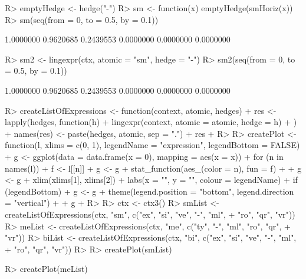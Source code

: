 \documentclass{article}\usepackage[]{graphicx}\usepackage[]{color}
\begin{document}
\begin{Schunk}
% --begin: "emptyhedge1"
\begin{Sinput}
R> emptyHedge <- hedge("-")
R> sm <- function(x) emptyHedge(smHoriz(x))
R> sm(seq(from = 0, to = 0.5, by = 0.1))
\end{Sinput}
\begin{Soutput}
[1] 1.0000000 0.9620685 0.2439553 0.0000000 0.0000000 0.0000000
\end{Soutput}
%
% --end: "emptyhedge1"
\end{Schunk}

\begin{Schunk}
% --begin: "emptyhedge2"
\begin{Sinput}
R> sm2 <- lingexpr(ctx, atomic = "sm", hedge = "-")
R> sm2(seq(from = 0, to = 0.5, by = 0.1))
\end{Sinput}
\begin{Soutput}
[1] 1.0000000 0.9620685 0.2439553 0.0000000 0.0000000 0.0000000
\end{Soutput}
%
% --end: "emptyhedge2"
\end{Schunk}

\begin{Schunk}
\begin{Sinput}
R> createListOfExpressions <- function(context, atomic, hedges) {
+      res <- lapply(hedges, function(h) {
+          lingexpr(context, atomic = atomic, hedge = h)
+      })
+      names(res) <- paste(hedges, atomic, sep = ".")
+      res
+  }
R> 
R> createPlot <- function(l, xlims = c(0, 1), legendName = "expression", legendBottom = FALSE) {
+      g <- ggplot(data = data.frame(x = 0), mapping = aes(x = x))
+      for (n in names(l)) {
+          f <- l[[n]]
+          g <- g + stat_function(aes_(color = n), fun = f)
+      }
+      g <- g + xlim(xlims[1], xlims[2]) + labs(x = "", y = "", colour = legendName)
+      if (legendBottom) {
+          g <- g + theme(legend.position = "bottom", legend.direction = "vertical")
+      }
+      g
+  }
R> 
R> ctx <- ctx3()
R> smList <- createListOfExpressions(ctx, "sm", c("ex", "si", "ve", "-", "ml", 
+      "ro", "qr", "vr"))
R> meList <- createListOfExpressions(ctx, "me", c("ty", "-", "ml", "ro", "qr", 
+      "vr"))
R> biList <- createListOfExpressions(ctx, "bi", c("ex", "si", "ve", "-", "ml", 
+      "ro", "qr", "vr"))
R> 
R> createPlot(smList)
\end{Sinput}
\end{Schunk}

\begin{Schunk}
\begin{Sinput}
R> createPlot(meList)
\end{Sinput}
\end{Schunk}
\end{document}
